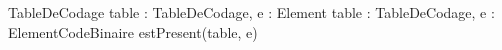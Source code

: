 \begin{algorithme}
        {}{TableDeCodage}
        {}
        {
        }
        {}
        {
        }
        {}
        {table : TableDeCodage, e : Element}{\booleen}
        {}
        {table : TableDeCodage, e : Element}{CodeBinaire}
        {estPresent(table, e)}
\end{algorithme}